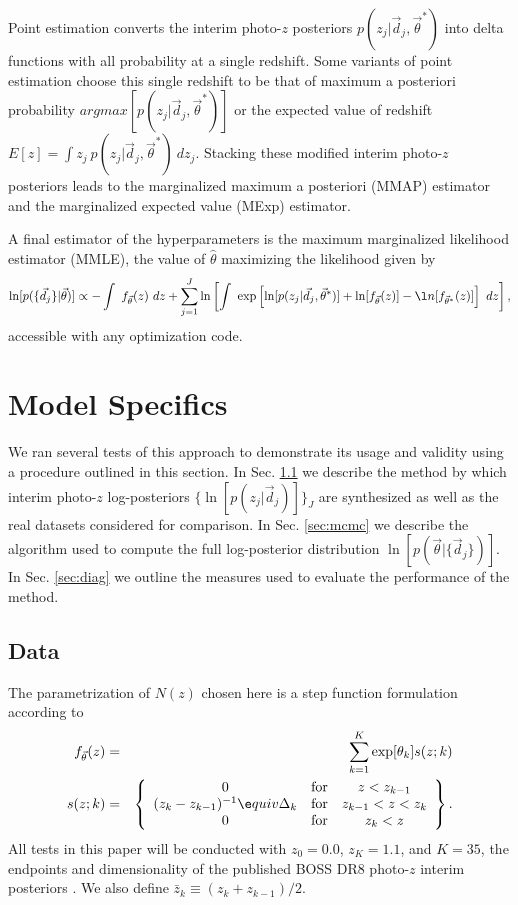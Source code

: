 \documentclass[preprint]{aastex}
\begin{document}
Point estimation converts the interim photo-$z$ posteriors 
$p(z_{j}|\vec{d}_{j},\vec{\theta}^{*})$ into delta functions with all 
probability at a single redshift.  Some variants of point estimation choose 
this single redshift to be that of maximum a posteriori probability 
$argmax[p(z_{j}|\vec{d}_{j},\vec{\theta}^{*})]$ or the expected value of 
redshift $E[z]=\int z_{j}\ p(z_{j}|\vec{d}_{j},\vec{\theta}^{*})\ dz_{j}$.  
Stacking these modified interim photo-$z$ posteriors leads to the marginalized 
maximum a posteriori (MMAP) estimator and the marginalized expected value 
(MExp) estimator.

A final estimator of the hyperparameters is the maximum marginalized likelihood 
estimator (MMLE), the value of $\hat{\theta}$ maximizing the likelihood given 
by 
\begin{equation}
\label{eq:mmle}
\ln[p(\{\vec{d}_{j}\}|\vec{\theta})] \propto -\int\ f_{\vec{\theta}}(z)\ 
dz+\sum_{j=1}^{J}\ln\left[\int\ 
\exp\left[\ln[p(z_{j}|\vec{d}_{j},\vec{\theta}^{*})]+\ln[f_{\vec{\theta}}(z)]-\l
n[f_{\vec{\theta}^{*}}(z)]\right]\ dz\right],
\end{equation}
accessible with any optimization code.

\section{Model Specifics}
\label{sec:exp}

We ran several tests of this approach to demonstrate its usage and validity 
using a procedure outlined in this section.  In Sec. \ref{sec:alldata} we 
describe the method by which interim photo-$z$ log-posteriors 
$\{\ln[p(z_{j}|\vec{d}_{j})]\}_{J}$ are synthesized as well as the real 
datasets considered for comparison.  In Sec. \ref{sec:mcmc} we describe the 
algorithm used to compute the full log-posterior distribution 
$\ln[p(\vec{\theta}|\{\vec{d}_{j}\})]$.  In Sec. \ref{sec:diag} we outline the 
measures used to evaluate the performance of the method.

\subsection{Data}
\label{sec:alldata}

The parametrization of $N(z)$ chosen here is a step function formulation 
according to
\begin{eqnarray}
\label{eq:steps}
f_{\vec{\theta}}(z)&=&\sum_{k=1}^{K}\exp[\theta_{k}]s(z;k)\\
s(z;k)&=&\left\{\begin{array}{ccc}0&\text{for}&z<z_{k-1}\\(z_{k}-z_{k-1})^{-1}\e
quiv\Delta_{k}&\text{for}&z_{k-1}<z<z_{k}\\0&\text{for}&z_{k}<z\end{array}\right
\}.
\end{eqnarray}
All tests in this paper will be conducted with $z_{0}=0.0$, $z_{K}=1.1$, and 
$K=35$, the endpoints and dimensionality of the published BOSS DR8 photo-$z$ 
interim posteriors \citet{Sheldon2012}.  We also define 
$\bar{z}_{k}\equiv(z_{k}+z_{k-1})/2$.
\end{document}

